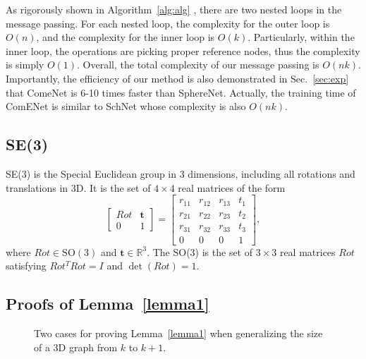 \documentclass{article}
\begin{document}
As rigorously shown in Algorithm~\ref{alg:alg} , there are two nested loops in the message passing.
For each nested loop, the complexity for the outer loop is $O(n)$, and the complexity for the inner loop is $O(k)$.
Particularly, within the inner loop,
the operations are picking proper reference nodes, thus the complexity is simply $O(1)$. 
Overall, the total complexity of our message passing is $O(nk)$.
Importantly, the efficiency of our method is also demonstrated in Sec.~\ref{sec:exp} that ComeNet is 6-10 times faster than SphereNet.
Actually, the training time of ComENet is similar to SchNet whose complexity is also $O(nk)$.

\subsection{SE(3)} \label{SE(3)}
\textcolor{COLOR}{
SE(3) is the Special Euclidean group in 3 dimensions, including all rotations and translations in 3D. It is the set of $4\times 4$ real matrices of the form 
\begin{equation}
    \begin{bmatrix}
    Rot & \textbf{t} \\
    0 & 1 
    \end{bmatrix}
    =
    \begin{bmatrix}
    r_{11} & r_{12} & r_{13} & t_1\\
    r_{21} & r_{22} & r_{23} & t_2\\
    r_{31} & r_{32} & r_{33} & t_3\\
    0 &0 &0 &1
    \end{bmatrix},
\end{equation}
where $Rot\in \mathrm{SO(3)}$ and $\textbf{t}\in \mathbb{R}^{3}$. 
The SO(3) is the set of $3\times 3$ real matrices $Rot$ satisfying 
$Rot^TRot=I$ and $\det(Rot)=1$.
}

\subsection{Proofs of Lemma~\ref{lemma1}} \label{sec:proof}

\captionsetup[subfigure]{labelformat=empty}
\begin{figure*}[ht]
     \centering
     \qquad
    \caption{Two cases for proving Lemma~\ref{lemma1} when generalizing the size of a 3D graph from $k$ to $k+1$.}
    \label{fig:n_to_n+1}
    \vspace{-10pt}
\end{figure*}
\end{document}
